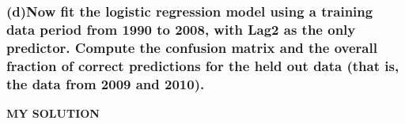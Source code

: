 \documentclass[
]{article}
\begin{document}
\hypertarget{dnow-fit-the-logistic-regression-model-using-a-training-data-period-from-1990-to-2008-with-lag2-as-the-only-predictor.-compute-the-confusion-matrix-and-the-overall-fraction-of-correct-predictions-for-the-held-out-data-that-is-the-data-from-2009-and-2010.}{%
\subsubsection{\texorpdfstring{\textbf{(d)Now fit the logistic
regression model using a training data period from 1990 to 2008, with
Lag2 as the only predictor. Compute the confusion matrix and the overall
fraction of correct predictions for the held out data (that is, the data
from 2009 and
2010).}}{(d)Now fit the logistic regression model using a training data period from 1990 to 2008, with Lag2 as the only predictor. Compute the confusion matrix and the overall fraction of correct predictions for the held out data (that is, the data from 2009 and 2010).}}\label{dnow-fit-the-logistic-regression-model-using-a-training-data-period-from-1990-to-2008-with-lag2-as-the-only-predictor.-compute-the-confusion-matrix-and-the-overall-fraction-of-correct-predictions-for-the-held-out-data-that-is-the-data-from-2009-and-2010.}}

\textbf{MY SOLUTION}
\end{document}
